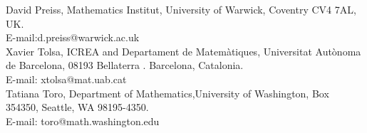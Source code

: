 \documentclass[12pt,leqno]{article}
\theoremstyle{plain}
\numberwithin{equation}{section}
\begin{document}
\vskip 1in

\noindent\footnotesize{David Preiss, Mathematics Institut, University
of Warwick, Coventry CV4 7AL, UK.\\
 E-mail:d.preiss@warwick.ac.uk}\\

\noindent\footnotesize{Xavier Tolsa, ICREA and Departament de Matem\`atiques,
Universitat Aut\`onoma de Barcelona, 08193 Bellaterra . Barcelona,
Catalonia.\\
 E-mail: xtolsa@mat.uab.cat}\\

\noindent\footnotesize{Tatiana Toro,
Department of Mathematics,University of Washington,
Box 354350, Seattle, WA 98195-4350.\\
 E-mail: toro@math.washington.edu}
\end{document}
